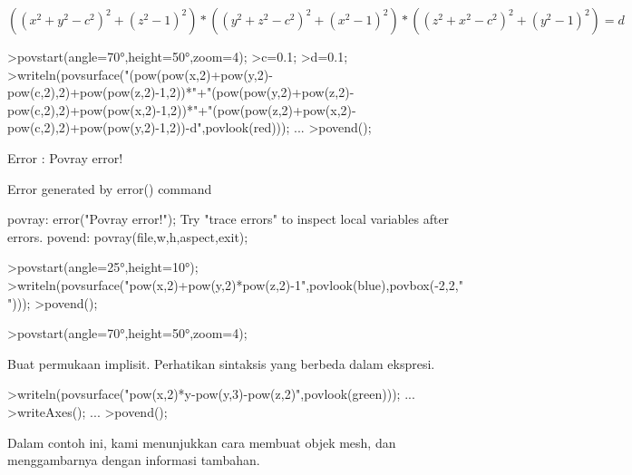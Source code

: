 \documentclass{article}
\begin{document}
\begin{eulernotebook}
\begin{eulercomment}
\begin{eulercomment}
\begin{eulercomment}
\begin{eulercomment}
\begin{eulercomment}
\begin{eulercomment}
\begin{eulercomment}
\begin{eulercomment}
\begin{eulercomment}
\begin{eulercomment}
\begin{eulercomment}
\begin{eulercomment}
\begin{eulercomment}
\begin{eulercomment}
\begin{eulercomment}
\begin{eulercomment}
\begin{eulercomment}
\end{eulercomment}
\begin{eulerformula}
\[
((x^2+y^2-c^2)^2+(z^2-1)^2)*((y^2+z^2-c^2)^2+(x^2-1)^2)*((z^2+x^2-c^2)^2+(y^2-1)^2)=d
\]
\end{eulerformula}
\begin{eulerprompt}
>povstart(angle=70°,height=50°,zoom=4);
>c=0.1;
>d=0.1;
>writeln(povsurface("(pow(pow(x,2)+pow(y,2)-pow(c,2),2)+pow(pow(z,2)-1,2))*"+"(pow(pow(y,2)+pow(z,2)-pow(c,2),2)+pow(pow(x,2)-1,2))*"+"(pow(pow(z,2)+pow(x,2)-pow(c,2),2)+pow(pow(y,2)-1,2))-d",povlook(red))); ...
>povend();
\end{eulerprompt}
\begin{euleroutput}
  Error : Povray error!
  
  Error generated by error() command
  
  povray:
      error("Povray error!");
  Try "trace errors" to inspect local variables after errors.
  povend:
      povray(file,w,h,aspect,exit); 
\end{euleroutput}
\begin{eulerprompt}
>povstart(angle=25°,height=10°); 
>writeln(povsurface("pow(x,2)+pow(y,2)*pow(z,2)-1",povlook(blue),povbox(-2,2,"")));
>povend();
\end{eulerprompt}
\begin{eulerprompt}
>povstart(angle=70°,height=50°,zoom=4);
\end{eulerprompt}
\begin{eulercomment}
Buat permukaan implisit. Perhatikan sintaksis yang berbeda dalam
ekspresi.
\end{eulercomment}
\begin{eulerprompt}
>writeln(povsurface("pow(x,2)*y-pow(y,3)-pow(z,2)",povlook(green))); ...
>writeAxes(); ...
>povend();
\end{eulerprompt}
\begin{eulercomment}
Dalam contoh ini, kami menunjukkan cara membuat objek mesh, dan
menggambarnya dengan informasi tambahan.


\end{eulercomment}
\end{eulercomment}
\end{eulercomment}
\end{eulercomment}
\end{eulercomment}
\end{eulercomment}
\end{eulercomment}
\end{eulercomment}
\end{eulercomment}
\end{eulercomment}
\end{eulercomment}
\end{eulercomment}
\end{eulercomment}
\end{eulercomment}
\end{eulercomment}
\end{eulercomment}
\end{eulercomment}
\end{eulernotebook}
\end{document}
